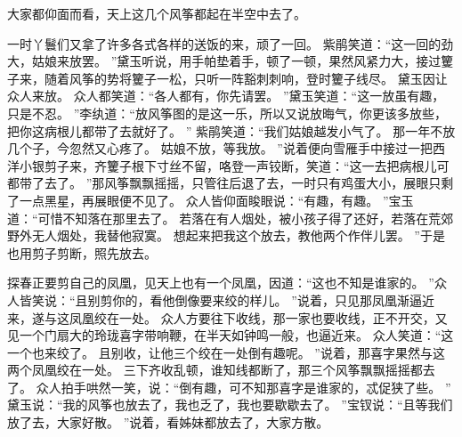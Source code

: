 大家都仰面而看，天上这几个风筝都起在半空中去了。
\par
{}
\par
一时丫鬟们又拿了许多各式各样的送饭的来，顽了一回。
紫鹃笑道：“这一回的劲大，姑娘来放罢。
”黛玉听说，用手帕垫着手，顿了一顿，果然风紧力大，接过籰子来，随着风筝的势将籰子一松，只听一阵豁刺刺响，登时籰子线尽。
黛玉因让众人来放。
众人都笑道：“各人都有，你先请罢。
”黛玉笑道：“这一放虽有趣，只是不忍。
”李纨道：“放风筝图的是这一乐，所以又说放晦气，你更该多放些，把你这病根儿都带了去就好了。
”
紫鹃笑道：“我们姑娘越发小气了。
那一年不放几个子，今忽然又心疼了。
姑娘不放，等我放。
”说着便向雪雁手中接过一把西洋小银剪子来，齐籰子根下寸丝不留，咯登一声铰断，笑道：“这一去把病根儿可都带了去了。
”那风筝飘飘摇摇，只管往后退了去，一时只有鸡蛋大小，展眼只剩了一点黑星，再展眼便不见了。
众人皆仰面睃眼说：“有趣，有趣。
”宝玉道：“可惜不知落在那里去了。
若落在有人烟处，被小孩子得了还好，若落在荒郊野外无人烟处，我替他寂寞。
想起来把我这个放去，教他两个作伴儿罢。
”于是也用剪子剪断，照先放去。
\par
{}
\par
探春正要剪自己的凤凰，见天上也有一个凤凰，因道：“这也不知是谁家的。
”众人皆笑说：“且别剪你的，看他倒像要来绞的样儿。
”说着，只见那凤凰渐逼近来，遂与这凤凰绞在一处。
众人方要往下收线，那一家也要收线，正不开交，又见一个门扇大的玲珑喜字带响鞭，在半天如钟鸣一般，也逼近来。
众人笑道：“这一个也来绞了。
且别收，让他三个绞在一处倒有趣呢。
”说着，那喜字果然与这两个凤凰绞在一处。
三下齐收乱顿，谁知线都断了，那三个风筝飘飘摇摇都去了。
众人拍手哄然一笑，说：“倒有趣，可不知那喜字是谁家的，忒促狭了些。
”
黛玉说：“我的风筝也放去了，我也乏了，我也要歇歇去了。
”宝钗说：“且等我们放了去，大家好散。
”说着，看姊妹都放去了，大家方散。
